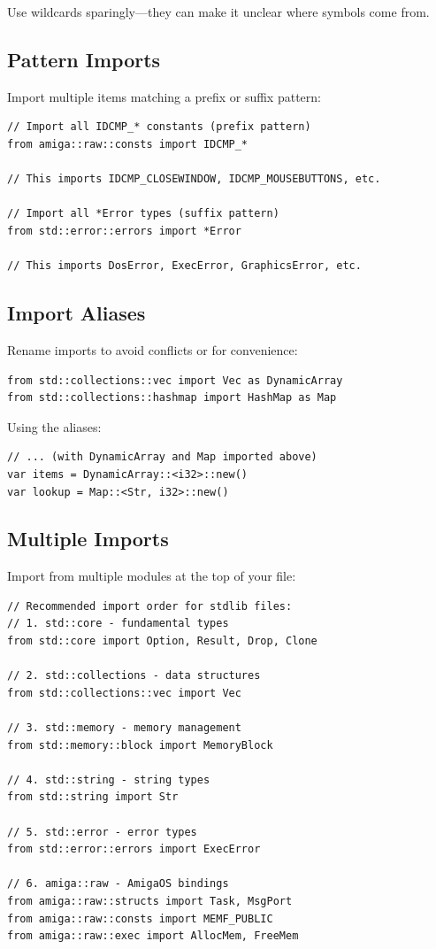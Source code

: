 Use wildcards sparingly---they can make it unclear where symbols come from.

\subsection{Pattern Imports}
\label{subsec:pattern-imports}

Import multiple items matching a prefix or suffix pattern:

\begin{lstlisting}
// Import all IDCMP_* constants (prefix pattern)
from amiga::raw::consts import IDCMP_*

// This imports IDCMP_CLOSEWINDOW, IDCMP_MOUSEBUTTONS, etc.

// Import all *Error types (suffix pattern)
from std::error::errors import *Error

// This imports DosError, ExecError, GraphicsError, etc.
\end{lstlisting}

\subsection{Import Aliases}
\label{subsec:import-aliases}

Rename imports to avoid conflicts or for convenience:

\begin{lstlisting}
from std::collections::vec import Vec as DynamicArray
from std::collections::hashmap import HashMap as Map
\end{lstlisting}

Using the aliases:

\begin{lstlisting}
// ... (with DynamicArray and Map imported above)
var items = DynamicArray::<i32>::new()
var lookup = Map::<Str, i32>::new()
\end{lstlisting}

\subsection{Multiple Imports}
\label{subsec:multiple-imports}

Import from multiple modules at the top of your file:

\begin{lstlisting}
// Recommended import order for stdlib files:
// 1. std::core - fundamental types
from std::core import Option, Result, Drop, Clone

// 2. std::collections - data structures
from std::collections::vec import Vec

// 3. std::memory - memory management
from std::memory::block import MemoryBlock

// 4. std::string - string types
from std::string import Str

// 5. std::error - error types
from std::error::errors import ExecError

// 6. amiga::raw - AmigaOS bindings
from amiga::raw::structs import Task, MsgPort
from amiga::raw::consts import MEMF_PUBLIC
from amiga::raw::exec import AllocMem, FreeMem
\end{lstlisting}

